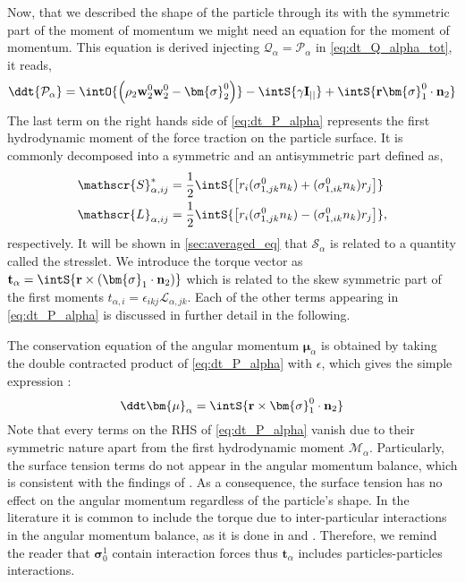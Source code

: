 Now, that we described the shape of the particle through its with the symmetric part of the moment of momentum we might need an equation for the moment of momentum. 
This equation is derived injecting $\mathcal{Q}_\alpha = \mathcal{P}_\alpha$ in \ref{eq:dt_Q_alpha_tot}, it reads, 
\begin{equation}
    \ddt {\mathcal{P}_\alpha}
    = \intO{ \left(
        \rho_2  \textbf{w}_2^0 \textbf{w}_2^0 
        - \bm{\sigma}_2^0
    \right) }
    - \intS{ 
        \gamma \textbf{I}_{||}
    }
    + \intS{ \textbf{r}\bm{\sigma}_1^0\cdot \textbf{n}_2} 
    \label{eq:dt_P_alpha}
\end{equation}
The last term on the right hands side of \ref{eq:dt_P_alpha} represents the first hydrodynamic moment of the force traction on the particle surface.
It is commonly  decomposed into a symmetric and an antisymmetric part defined as, 
\begin{align}
    \label{eq:M_decomposition}
    \mathscr{S}_{\alpha,ij}^*
    &= \frac{1}{2}  \intS{ \left[
        r_i(\sigma_{1,jk}^0 n_k)
        + (\sigma_{1,ik}^0 n_k)r_j
        \right]}
    \\
    \mathscr{L}_{\alpha,ij}
    &= \frac{1}{2}  \intS{ \left[
        r_i(\sigma_{1,jk}^0 n_k)
        - (\sigma_{1,ik}^0 n_k)r_j
    \right]}, \nonumber
\end{align}
respectively. 
It will be shown in \ref{sec:averaged_eq} that $\mathscr{S}_\alpha$ is related to a quantity called the stresslet. 
We introduce the torque vector as $\textbf{t}_\alpha = \intS{ \textbf{r} \times (\bm{\sigma}_1\cdot \textbf{n}_2) }$ which is related to the skew symmetric part of the first moments $t_{\alpha,i} = \epsilon_{ikj} \mathscr{L}_{\alpha,jk}$. 
Each of the other terms appearing in \ref{eq:dt_P_alpha} is discussed in further detail in the following.
 

The conservation equation of the angular momentum $\bm{\mu}_\alpha$ is obtained by taking the double contracted product of \ref{eq:dt_P_alpha} with $\epsilon$, which gives the simple expression :
\begin{equation}
    \ddt\bm{\mu}_\alpha
    =  
    \intS{ \textbf{r} \times \bm{\sigma}_1^0\cdot \textbf{n}_2 }
    \label{eq:dt_mu_alpha}
\end{equation}
Note that every terms on the RHS of \ref{eq:dt_P_alpha} vanish due to their symmetric nature apart from the first hydrodynamic moment $\mathcal{M}_\alpha$.
Particularly, the surface tension terms do not appear in the angular momentum balance, which is consistent with the findings of \citet{hesla1993note}. 
As a consequence, the surface tension has no effect on the angular momentum regardless of the particle's shape. 
In the literature it is common to include the torque due to inter-particular interactions in the angular momentum balance, as it is done in \citet{jackson1997locally} and \citet{zhang1997momentum}.
Therefore, we remind the reader that $\bm{\sigma}_0^1$ contain interaction forces thus $\textbf{t}_\alpha$ includes particles-particles interactions.


